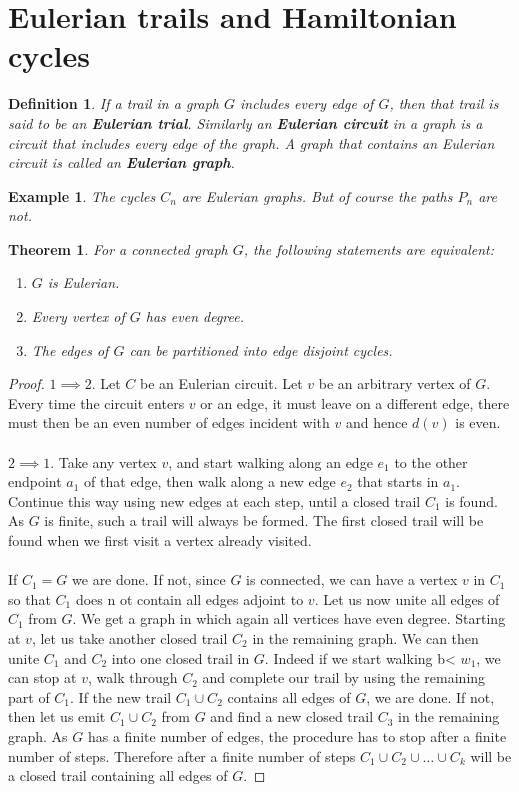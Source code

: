\documentclass[12pt,a4paper]{article}
\newtheorem{thm}{Theorem}[section]
\newtheorem{defn}{Definition}[section]
\newtheorem{exmp}{Example}[section]
\theoremstyle{definition}
\begin{document}
\section{Eulerian trails and Hamiltonian cycles}
\begin{defn} If a trail in a graph $G$ includes every edge of $G$, then that trail is said to be an \textbf{Eulerian trial}. Similarly an \textbf{Eulerian circuit} in a graph is a circuit that includes every edge of the graph. A graph that contains an Eulerian circuit is called an \textbf{Eulerian graph}.
\end{defn}
\begin{exmp} The cycles $C_n$ are Eulerian graphs. But of course the paths $P_n$ are not.
\end{exmp}
\begin{thm} \label{thm420} For a connected graph $G$, the following statements are equivalent:
\begin{enumerate}
\item $G$ is Eulerian.
\item Every vertex of $G$ has even degree.
\item The edges of $G$ can be partitioned into edge disjoint cycles.
\end{enumerate}
\end{thm}
\begin{proof}
$1 \implies 2$. Let $C$ be an Eulerian circuit. Let $v$ be an arbitrary vertex of $G$. Every time the circuit enters $v$ or an edge, it must leave on a different edge, there must then be an even number of edges incident with $v$ and hence $d(v)$ is even.
\\
\\
$2 \implies 1$. Take any vertex $v$, and start walking along an edge $e_1$ to the other endpoint $a_1$ of that edge, then walk along a new edge $e_2$ that starts in $a_1$. Continue this way using new  edges at each step, until a closed trail $C_1$ is found. As $G$ is finite, such a trail will always be formed. The first closed trail will be found when we first visit a vertex already visited.
\\\\
If $C_1 =G$ we are done. If not, since $G$ is connected, we can have a vertex $v$ in $C_1$ so that $C_1$ does n ot contain all edges adjoint to $v$. Let us now unite all edges of $C_1$ from $G$. We get a graph in which again all vertices have even degree. Starting at $v$, let us take another closed trail $C_2$ in the remaining graph. We can then unite $C_1$ and $C_2$ into one closed trail in $G$. Indeed if we start walking b< $w_1$, we can stop at $v$, walk through $C_2$ and complete our trail by using the remaining part of $C_1$. If the new trail $C_1 \cup C_2$ contains all edges of $G$, we are done. If not, then let us emit $C_1 \cup C_2$ from $G$ and find a new closed trail $C_3$ in the remaining graph. As $G$ has a finite number of edges, the procedure has to stop after a finite number of steps. Therefore after a finite number of steps $C_1 \cup C_2 \cup \dots \cup C_k$ will be a closed trail containing all edges of $G$. 
\end{proof}
\end{document}
